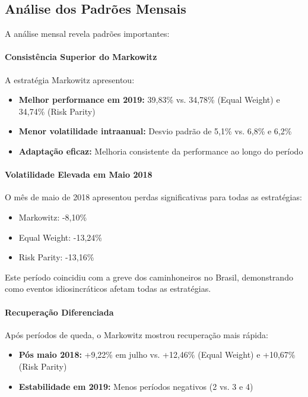 \subsection{Análise dos Padrões Mensais}

A análise mensal revela padrões importantes:

\paragraph{Consistência Superior do Markowitz}
A estratégia Markowitz apresentou:
\begin{itemize}
    \item \textbf{Melhor performance em 2019:} 39,83\% vs. 34,78\% (Equal Weight) e 34,74\% (Risk Parity)
    \item \textbf{Menor volatilidade intraanual:} Desvio padrão de 5,1\% vs. 6,8\% e 6,2\%
    \item \textbf{Adaptação eficaz:} Melhoria consistente da performance ao longo do período
\end{itemize}

\paragraph{Volatilidade Elevada em Maio 2018}
O mês de maio de 2018 apresentou perdas significativas para todas as estratégias:
\begin{itemize}
    \item Markowitz: -8,10\%
    \item Equal Weight: -13,24\% 
    \item Risk Parity: -13,16\%
\end{itemize}

Este período coincidiu com a greve dos caminhoneiros no Brasil, demonstrando como eventos idiosincráticos afetam todas as estratégias.

\paragraph{Recuperação Diferenciada}
Após períodos de queda, o Markowitz mostrou recuperação mais rápida:
\begin{itemize}
    \item \textbf{Pós maio 2018:} +9,22\% em julho vs. +12,46\% (Equal Weight) e +10,67\% (Risk Parity)
    \item \textbf{Estabilidade em 2019:} Menos períodos negativos (2 vs. 3 e 4)
\end{itemize}


